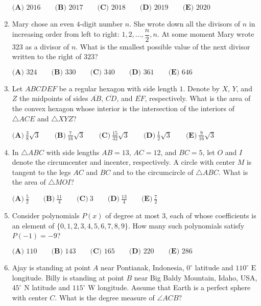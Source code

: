 \documentclass{article}
\begin{document}
\begin{enumerate}[label=\arabic*., itemsep=0.5em]
$\textbf{(A) } 2016 \qquad \textbf{(B) } 2017 \qquad \textbf{(C) } 2018 \qquad \textbf{(D) } 2019 \qquad \textbf{(E) } 2020$\par \vspace{0.5em}\item Mary chose an even $4$-digit number $n$. She wrote down all the divisors of $n$ in increasing order from left to right: $1,2,\ldots,\dfrac{n}{2},n$. At some moment Mary wrote $323$ as a divisor of $n$. What is the smallest possible value of the next divisor written to the right of $323$?

$\textbf{(A) } 324 \qquad \textbf{(B) } 330 \qquad \textbf{(C) } 340 \qquad \textbf{(D) } 361 \qquad \textbf{(E) } 646$\par \vspace{0.5em}\item Let $ABCDEF$ be a regular hexagon with side length $1$. Denote by $X$, $Y$, and $Z$ the midpoints of sides $\overline {AB}$, $\overline{CD}$, and $\overline{EF}$, respectively. What is the area of the convex hexagon whose interior is the intersection of the interiors of $\triangle ACE$ and $\triangle XYZ$?

$\textbf{(A)}\ \frac {3}{8}\sqrt{3} \qquad \textbf{(B)}\ \frac {7}{16}\sqrt{3} \qquad \textbf{(C)}\ \frac {15}{32}\sqrt{3} \qquad  \textbf{(D)}\ \frac {1}{2}\sqrt{3} \qquad \textbf{(E)}\ \frac {9}{16}\sqrt{3} $\par \vspace{0.5em}\item In $\triangle{ABC}$ with side lengths $AB = 13$, $AC = 12$, and $BC = 5$, let $O$ and $I$ denote the circumcenter and incenter, respectively. A circle with center $M$ is tangent to the legs $AC$ and $BC$ and to the circumcircle of $\triangle{ABC}$. What is the area of $\triangle{MOI}$?

$\textbf{(A)}\ \frac52\qquad\textbf{(B)}\ \frac{11}{4}\qquad\textbf{(C)}\ 3\qquad\textbf{(D)}\ \frac{13}{4}\qquad\textbf{(E)}\ \frac72$\par \vspace{0.5em}\item Consider polynomials $P(x)$ of degree at most $3$, each of whose coefficients is an element of $\{0, 1, 2, 3, 4, 5, 6, 7, 8, 9\}$. How many such polynomials satisfy $P(-1) = -9$?

$\textbf{(A) } 110 \qquad \textbf{(B) } 143 \qquad \textbf{(C) } 165 \qquad \textbf{(D) } 220 \qquad \textbf{(E) } 286 $\par \vspace{0.5em}\item Ajay is standing at point $A$ near Pontianak, Indonesia, $0^\circ$ latitude and $110^\circ \text{ E}$ longitude. Billy is standing at point $B$ near Big Baldy Mountain, Idaho, USA, $45^\circ \text{ N}$ latitude and $115^\circ \text{ W}$ longitude. Assume that Earth is a perfect sphere with center $C.$ What is the degree measure of $\angle ACB?$


\end{enumerate}
\end{document}

